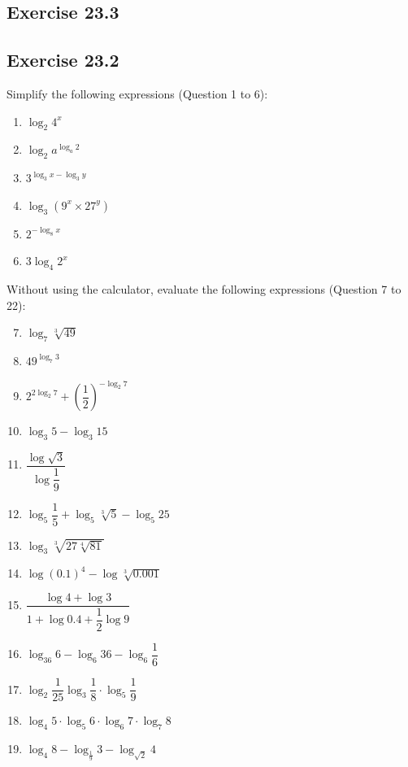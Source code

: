 \documentclass[12pt]{report}
\begin{document}
\subsection*{Exercise 23.3}

\subsection*{Exercise 23.2}

\setlength{\columnseprule}{1pt}
\setlength{\columnsep}{24pt}
\begin{multicols}{2}
    Simplify the following expressions (Question 1 to 6):
    \begin{enumerate}
        \item $\log_2 4^x$
        \item $\log_2 {a^{\log_a 2}}$
        \item $3^{\log_3 x - \log_3 y}$
        \item $\log_3 {(9^x \times 27^y)}$
        \item $2^{-\log_8 x}$
        \item $3\log_4 2^x$
    \end{enumerate}
    Without using the calculator, evaluate the following expressions (Question 7 to 22):
    \begin{enumerate}
        \setcounter{enumi}{6}
        \item $\log_7{\sqrt[3]{49}}$
        \item $49^{\log_7 3}$
        \item $2^{2\log_2 7}+\left({\dfrac{1}{2}}\right)^{-\log_2 7}$
        \item $\log_{3}5-\log_{3} 15$
        \item $\dfrac{\log{\sqrt{3}}}{\log{\dfrac{1}{9}}}$
        \item $\log_{5}{\dfrac{1}{5}}+\log_{5}{{\sqrt[3]{5}}-\log_{5}25}$
        \item $\log_{3}{\sqrt[3]{27{\sqrt[4]{81}}}}$
        \item $\log\left(0.1\right)^{4}-\log{\sqrt[3]{0.001}}$
        \item $\dfrac{\log4+\log3}{1+\log0.4+{\dfrac{1}{2}}\log9}$
        \item $\log_{36}6-\log_{6}36-\log_{6}{\dfrac{1}{6}}$
        \item $\log_{2}{\dfrac{1}{25}}\log_{3}{\dfrac{1}{8}}\cdot\log_{5}{\dfrac{1}{9}}$
        \item $\log_{4}5\cdot\log_{5}6\cdot\log_{6}7\cdot\log_{7}8$
        \item $\log_{4}8-\log_{\frac{1}{9}}3-\log_{\sqrt{2}}4$

\end{enumerate}
\end{multicols}
\end{document}
